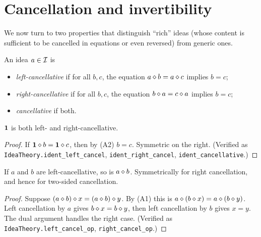 \section{Cancellation and invertibility}\label{sec:cancellation}

We now turn to two properties that distinguish ``rich'' ideas (whose
content is sufficient to be cancelled in equations or even reversed) from
generic ones.

\begin{definition}\label{def:cancellative}
An idea $a \in \mathcal{I}$ is
\begin{itemize}
\item \emph{left-cancellative} if for all $b, c$, the equation
$a \mathbin{\diamond} b = a \mathbin{\diamond} c$ implies $b = c$;
\item \emph{right-cancellative} if for all $b, c$, the equation
$b \mathbin{\diamond} a = c \mathbin{\diamond} a$ implies $b = c$;
\item \emph{cancellative} if both.
\end{itemize}
\end{definition}

\begin{lemma}\label{lem:unit-cancel}
$\mathbf{1}$ is both left- and right-cancellative.
\end{lemma}

\begin{proof}
If $\mathbf{1} \mathbin{\diamond} b = \mathbf{1} \mathbin{\diamond} c$, then by (A2) $b = c$.
Symmetric on the right.  (Verified as \texttt{IdeaTheory.ident\_left\_cancel},
\texttt{ident\_right\_cancel}, \texttt{ident\_cancellative}.)
\end{proof}

\begin{lemma}\label{lem:cancel-compose}
If $a$ and $b$ are left-cancellative, so is $a \mathbin{\diamond} b$.  Symmetrically
for right cancellation, and hence for two-sided cancellation.
\end{lemma}

\begin{proof}
Suppose $(a \mathbin{\diamond} b) \mathbin{\diamond} x = (a \mathbin{\diamond} b) \mathbin{\diamond} y$.  By (A1)
this is $a \mathbin{\diamond} (b \mathbin{\diamond} x) = a \mathbin{\diamond} (b \mathbin{\diamond} y)$.  Left
cancellation by $a$ gives $b \mathbin{\diamond} x = b \mathbin{\diamond} y$, then left
cancellation by $b$ gives $x = y$.  The dual argument handles the right
case.  (Verified as \texttt{IdeaTheory.left\_cancel\_op},
\texttt{right\_cancel\_op}.)
\end{proof}

